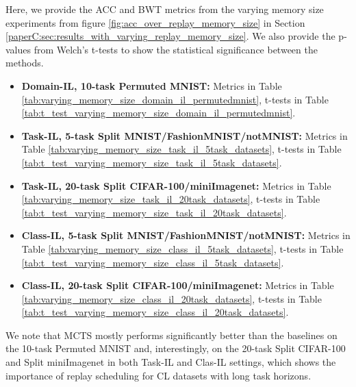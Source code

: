 Here, we provide the ACC and BWT metrics from the varying memory size experiments from figure \ref{fig:acc_over_replay_memory_size} in Section \ref{paperC:sec:results_with_varying_replay_memory_size}. We also provide the p-values from Welch's t-tests to show the statistical significance between the methods. 
\begin{itemize}[topsep=0pt, noitemsep]
	\item \textbf{Domain-IL, 10-task Permuted MNIST:} Metrics in Table \ref{tab:varying_memory_size_domain_il_permutedmnist}, t-tests in Table \ref{tab:t_test_varying_memory_size_domain_il_permutedmnist}.
	
	\item \textbf{Task-IL, 5-task Split MNIST/FashionMNIST/notMNIST:} Metrics in Table \ref{tab:varying_memory_size_task_il_5task_datasets}, t-tests in Table \ref{tab:t_test_varying_memory_size_task_il_5task_datasets}. 
	
	\item \textbf{Task-IL, 20-task Split CIFAR-100/miniImagenet:} Metrics in Table \ref{tab:varying_memory_size_task_il_20task_datasets}, t-tests in Table \ref{tab:t_test_varying_memory_size_task_il_20task_datasets}. 
	
	\item \textbf{Class-IL, 5-task Split MNIST/FashionMNIST/notMNIST:} Metrics in Table \ref{tab:varying_memory_size_class_il_5task_datasets}, t-tests in Table \ref{tab:t_test_varying_memory_size_class_il_5task_datasets}. 
	
	\item \textbf{Class-IL, 20-task Split CIFAR-100/miniImagenet:} Metrics in Table \ref{tab:varying_memory_size_class_il_20task_datasets}, t-tests in Table \ref{tab:t_test_varying_memory_size_class_il_20task_datasets}. 
\end{itemize}
We note that MCTS mostly performs significantly better than the baselines on the 10-task Permuted MNIST and, interestingly, on the 20-task Split CIFAR-100 and Split miniImagenet in both Task-IL and Clas-IL settings, which shows the importance of replay scheduling for CL datasets with long task horizons.    

